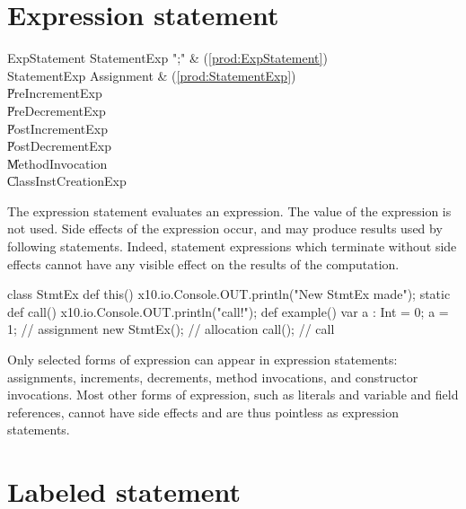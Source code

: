 \section{Expression statement}

\begin{bbgrammar}
        ExpStatement \: StatementExp \xcd";" & (\ref{prod:ExpStatement}) \\
        StatementExp \: Assignment & (\ref{prod:StatementExp}) \\
                    \| PreIncrementExp \\
                    \| PreDecrementExp \\
                    \| PostIncrementExp \\
                    \| PostDecrementExp \\
                    \| MethodInvocation \\
                    \| ClassInstCreationExp \\
\end{bbgrammar}

The expression statement evaluates an expression. The value of the expression
is not used. Side effects of the expression occur, and may produce results
used by following statements. Indeed, statement expressions which terminate
without side effects cannot have any visible effect on the results of the
computation. 


\begin{ex}
\begin{xten}
class StmtEx {
  def this() { x10.io.Console.OUT.println("New StmtEx made");  }
  static def call() { x10.io.Console.OUT.println("call!");  }
  def example() {
     var a : Int = 0;
     a = 1; // assignment
     new StmtEx(); // allocation
     call(); // call
  }
}
\end{xten}
%
\end{ex}


Only selected forms of expression can appear in expression statements:
assignments, increments, decrements, method invocations, and constructor
invocations. Most other forms of expression, such as literals and variable and
field references, cannot have side effects and are thus pointless as
expression statements.


\section{Labeled statement}


